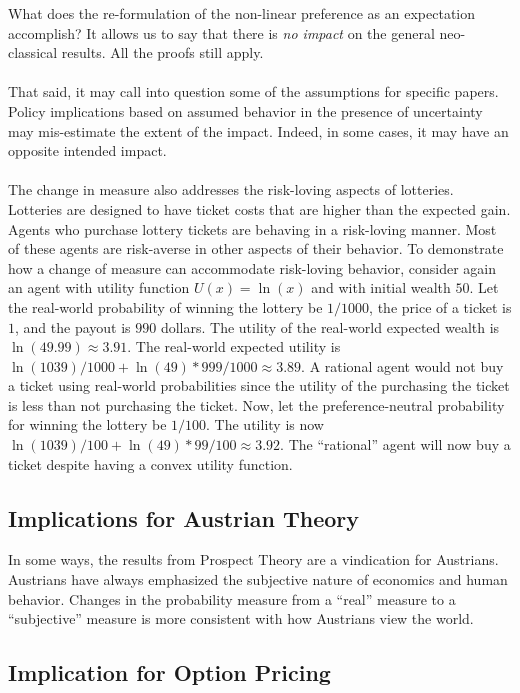 \documentclass{article}
\theoremstyle{definition}
\begin{document}
What does the re-formulation of the non-linear preference as an expectation accomplish?  It allows us to say that there is \emph{no impact} on the general neo-classical results.  All the proofs still apply. 
\\
\\
That said, it may call into question some of the assumptions for specific papers.  Policy implications based on assumed behavior in the presence of uncertainty may mis-estimate the extent of the impact.  Indeed, in some cases, it may have an opposite intended impact. 
\\
\\
The change in measure also addresses the risk-loving aspects of lotteries.  Lotteries are designed to have ticket costs that are higher than the expected gain.  Agents who purchase lottery tickets are behaving in a risk-loving manner.  Most of these agents are risk-averse in other aspects of their behavior.  To demonstrate how a change of measure can accommodate risk-loving behavior, consider again an agent with utility function \(U(x)=\ln(x)\) and with initial wealth \(50\).  Let the real-world probability of winning the lottery be \(1/1000\), the price of a ticket is \(1\), and the payout is \(990\) dollars.  The utility of the real-world expected wealth is \(\ln(49.99)\approx 3.91\).  The real-world expected utility is \(\ln(1039)/1000+\ln(49)*999/1000 \approx 3.89 \).  A rational agent would not buy a ticket using real-world probabilities since the utility of the purchasing the ticket is less than not purchasing the ticket.  Now, let the preference-neutral probability for winning the lottery be \(1/100\).  The utility is now \(\ln(1039)/100+\ln(49)*99/100 \approx 3.92 \).  The ``rational'' agent will now buy a ticket despite having a convex utility function.  

\subsection{Implications for Austrian Theory}

In some ways, the results from Prospect Theory are a vindication for Austrians.  Austrians have always emphasized the subjective nature of economics and human behavior.  Changes in the probability measure from a ``real'' measure to a ``subjective'' measure is more consistent with how Austrians view the world.  

\subsection{Implication for Option Pricing}
\end{document}
